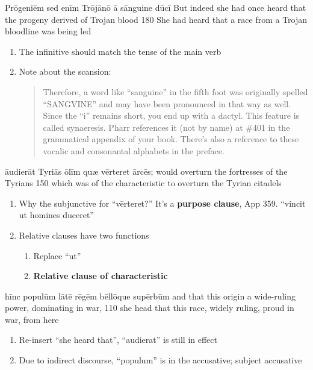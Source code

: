 \latline
{Pr\={\macron o}g\-en\-i\=em s\-ed \-en\=im Tr\=oj\={\macron a}n\={\macron o} \={\macron a} s\=angu\-ine d\={\macron u}c\={\macron i}}
{But indeed she had once heard that the progeny derived of Trojan blood}
{180}
{She had heard that a race from a Trojan bloodline was being led}
{\begin{enumerate}
	\item The infinitive should match the tense of the main verb
	\item Note about the scansion:  
	\begin{quote}
		Therefore, a word like ``sanguine'' in the fifth foot was originally spelled
    ``SANGVINE'' and may have been pronounced in that way as well. Since the ``i''
    remains short, you end up with a dactyl. This feature is called synaeresis.
    Pharr references it (not by name) at \#401 in the grammatical appendix of your
    book. There's also a reference to these vocalic and consonantal alphabets in
    the preface.
  \end{quote}
\end{enumerate}}

\latline
{\={au}d\-i\-er\=at T\-yr\-i\={\macron a}s \={\macron o}l\=im qu{\ae} v\=ert\-er\-et \=arc\={\macron e}s;}
{would overturn the fortresses of the Tyrians}
{150}
{which was of the characteristic to overturn the Tyrian citadels}
{\begin{enumerate}
	\item Why the subjunctive for ``v\=ert\-er\-et?''  It's a \textbf{purpose clause}, App 359.  ``vincit ut homines duceret''
	\item Relative clauses have two functions
	\begin{enumerate}
		\item Replace ``ut''
		\item \textbf{Relative clause of characteristic}
	\end{enumerate}
\end{enumerate}}

\latline
{h\=inc p\-op\-ul\=um l\={\macron a}t\={\macron e} r\={\macron e}g\=em b\=ell\={\macron o}qu\-e s\-up\=erb\=um}
{and that this origin a wide-ruling power, dominating in war,}
{110}
{she head that this race, widely ruling, proud in war, from here}
{\begin{enumerate}
	\item Re-insert ``she heard that'', ``audierat'' is still in effect
	\item Due to indirect discourse, ``populum'' is in the accusative; subject accusative
\end{enumerate}}


